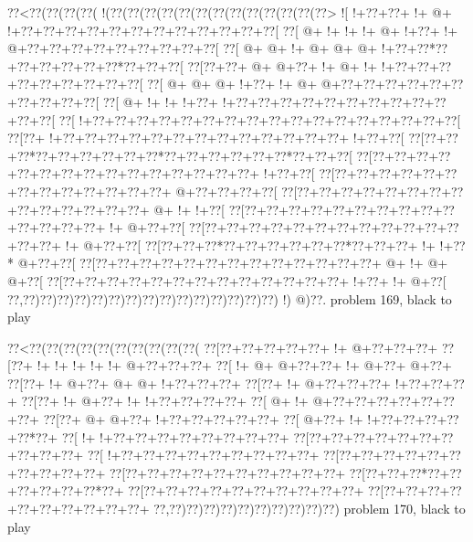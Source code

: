 \vbox{\vbox{\goo
\0??<\0??(\0??(\0??(\0??(\- !(\0??(\0??(\0??(\0??(\0??(\0??(\0??(\0??(\0??(\0??(\0??(\0??(\0??>
\- ![\- !+\0??+\0??+\- !+\- @+\- !+\0??+\0??+\0??+\0??+\0??+\0??+\0??+\0??+\0??+\0??+\0??+\0??[
\0??[\- @+\- !+\- !+\- !+\- @+\- !+\0??+\- !+\- @+\0??+\0??+\0??+\0??+\0??+\0??+\0??+\0??+\0??[
\0??[\- @+\- @+\- !+\- @+\- @+\- @+\- !+\0??+\0??*\0??+\0??+\0??+\0??+\0??+\0??*\0??+\0??+\0??[
\0??[\0??+\0??+\- @+\- @+\0??+\- !+\- @+\- !+\- !+\0??+\0??+\0??+\0??+\0??+\0??+\0??+\0??+\0??[
\0??[\- @+\- @+\- @+\- !+\0??+\- !+\- @+\- @+\0??+\0??+\0??+\0??+\0??+\0??+\0??+\0??+\0??+\0??[
\0??[\- @+\- !+\- !+\- !+\0??+\- !+\0??+\0??+\0??+\0??+\0??+\0??+\0??+\0??+\0??+\0??+\0??+\0??[
\0??[\- !+\0??+\0??+\0??+\0??+\0??+\0??+\0??+\0??+\0??+\0??+\0??+\0??+\0??+\0??+\0??+\0??+\0??[
\0??[\0??+\- !+\0??+\0??+\0??+\0??+\0??+\0??+\0??+\0??+\0??+\0??+\0??+\0??+\0??+\- !+\0??+\0??[
\0??[\0??+\0??+\0??*\0??+\0??+\0??+\0??+\0??+\0??*\0??+\0??+\0??+\0??+\0??+\0??*\0??+\0??+\0??[
\0??[\0??+\0??+\0??+\0??+\0??+\0??+\0??+\0??+\0??+\0??+\0??+\0??+\0??+\0??+\0??+\- !+\0??+\0??[
\0??[\0??+\0??+\0??+\0??+\0??+\0??+\0??+\0??+\0??+\0??+\0??+\0??+\0??+\- @+\0??+\0??+\0??+\0??[
\0??[\0??+\0??+\0??+\0??+\0??+\0??+\0??+\0??+\0??+\0??+\0??+\0??+\0??+\0??+\- @+\- !+\- !+\0??[
\0??[\0??+\0??+\0??+\0??+\0??+\0??+\0??+\0??+\0??+\0??+\0??+\0??+\0??+\0??+\- !+\- @+\0??+\0??[
\0??[\0??+\0??+\0??+\0??+\0??+\0??+\0??+\0??+\0??+\0??+\0??+\0??+\0??+\0??+\- !+\- @+\0??+\0??[
\0??[\0??+\0??+\0??*\0??+\0??+\0??+\0??+\0??+\0??*\0??+\0??+\0??+\- !+\- !+\0??*\- @+\0??+\0??[
\0??[\0??+\0??+\0??+\0??+\0??+\0??+\0??+\0??+\0??+\0??+\0??+\0??+\0??+\- @+\- !+\- @+\- @+\0??[
\0??[\0??+\0??+\0??+\0??+\0??+\0??+\0??+\0??+\0??+\0??+\0??+\0??+\0??+\- !+\0??+\- !+\- @+\0??[
\0??,\0??)\0??)\0??)\0??)\0??)\0??)\0??)\0??)\0??)\0??)\0??)\0??)\0??)\0??)\0??)\- !)\- @)\0??.
}
\hfil problem 169, black to play\hfil\break
}

\vbox{\vbox{\goo
\0??<\0??(\0??(\0??(\0??(\0??(\0??(\0??(\0??(\0??(\0??(
\0??[\0??+\0??+\0??+\0??+\0??+\- !+\- @+\0??+\0??+\0??+
\0??[\0??+\- !+\- !+\- !+\- !+\- !+\- @+\0??+\0??+\0??+
\0??[\- !+\- @+\- @+\0??+\0??+\- !+\- @+\0??+\- @+\0??+
\0??[\0??+\- !+\- @+\0??+\- @+\- @+\- !+\0??+\0??+\0??+
\0??[\0??+\- !+\- @+\0??+\0??+\0??+\- !+\0??+\0??+\0??+
\0??[\0??+\- !+\- @+\0??+\- !+\- !+\0??+\0??+\0??+\0??+
\0??[\- @+\- !+\- @+\0??+\0??+\0??+\0??+\0??+\0??+\0??+
\0??[\0??+\- @+\- @+\0??+\- !+\0??+\0??+\0??+\0??+\0??+
\0??[\- @+\0??+\- !+\- !+\0??+\0??+\0??+\0??+\0??*\0??+
\0??[\- !+\- !+\0??+\0??+\0??+\0??+\0??+\0??+\0??+\0??+
\0??[\0??+\0??+\0??+\0??+\0??+\0??+\0??+\0??+\0??+\0??+
\0??[\- !+\0??+\0??+\0??+\0??+\0??+\0??+\0??+\0??+\0??+
\0??[\0??+\0??+\0??+\0??+\0??+\0??+\0??+\0??+\0??+\0??+
\0??[\0??+\0??+\0??+\0??+\0??+\0??+\0??+\0??+\0??+\0??+
\0??[\0??+\0??+\0??*\0??+\0??+\0??+\0??+\0??+\0??*\0??+
\0??[\0??+\0??+\0??+\0??+\0??+\0??+\0??+\0??+\0??+\0??+
\0??[\0??+\0??+\0??+\0??+\0??+\0??+\0??+\0??+\0??+\0??+
\0??,\0??)\0??)\0??)\0??)\0??)\0??)\0??)\0??)\0??)\0??)
}
\hfil problem 170, black to play\hfil\break
}

